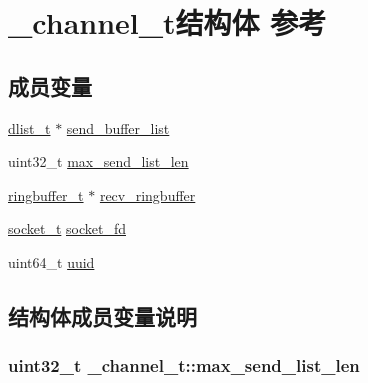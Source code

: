\hypertarget{a00006}{}\section{\+\_\+channel\+\_\+t结构体 参考}
\label{a00006}
\subsection*{成员变量}
\begin{DoxyCompactItemize}
\item 
\hyperlink{a00047_ad6644d67df4b4e3596c1eb12977d1d16_ad6644d67df4b4e3596c1eb12977d1d16}{dlist\+\_\+t} $\ast$ \hyperlink{a00006_afb34664957775dd12ca46abfd8b640d2_afb34664957775dd12ca46abfd8b640d2}{send\+\_\+buffer\+\_\+list}
\item 
uint32\+\_\+t \hyperlink{a00006_a5508b5b3a6398c4ae99698a6f61284aa_a5508b5b3a6398c4ae99698a6f61284aa}{max\+\_\+send\+\_\+list\+\_\+len}
\item 
\hyperlink{a00047_af929c5cf86b6a0f64dde407dfe60482e_af929c5cf86b6a0f64dde407dfe60482e}{ringbuffer\+\_\+t} $\ast$ \hyperlink{a00006_aef08f14aa19b7df9255d93fced554200_aef08f14aa19b7df9255d93fced554200}{recv\+\_\+ringbuffer}
\item 
\hyperlink{a00047_a0d9e0afbf02fb6ed6c5b1415dce51b05_a0d9e0afbf02fb6ed6c5b1415dce51b05}{socket\+\_\+t} \hyperlink{a00006_a6bc972bd52fd95bada62bbd8afe65e1e_a6bc972bd52fd95bada62bbd8afe65e1e}{socket\+\_\+fd}
\item 
uint64\+\_\+t \hyperlink{a00006_a9bacff19ff16310a0b60c5d8a55924b6_a9bacff19ff16310a0b60c5d8a55924b6}{uuid}
\end{DoxyCompactItemize}


\subsection{结构体成员变量说明}
\hypertarget{a00006_a5508b5b3a6398c4ae99698a6f61284aa_a5508b5b3a6398c4ae99698a6f61284aa}{}
\subsubsection[{max\+\_\+send\+\_\+list\+\_\+len}]{\setlength{\rightskip}{0pt plus 5cm}uint32\+\_\+t \+\_\+channel\+\_\+t\+::max\+\_\+send\+\_\+list\+\_\+len}\label{a00006_a5508b5b3a6398c4ae99698a6f61284aa_a5508b5b3a6398c4ae99698a6f61284aa}
\hypertarget{a00006_aef08f14aa19b7df9255d93fced554200_aef08f14aa19b7df9255d93fced554200}{}
